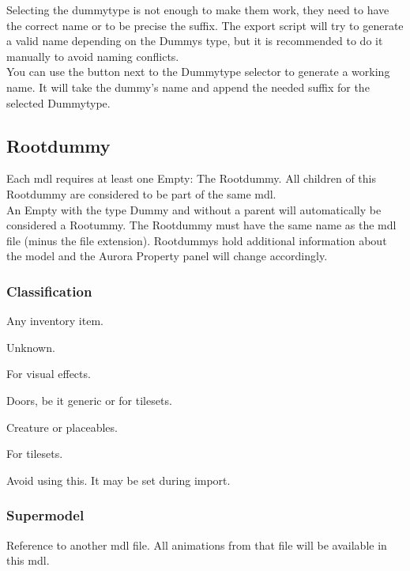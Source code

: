 Selecting the dummytype is not enough to make them work, they need to have
the correct name or to be precise the suffix.
The export script will try to generate a valid name depending on
the Dummys type, but it is recommended to do it manually to avoid naming
conflicts. \\

You can use the button next to the Dummytype selector to generate a
working name. It will take the dummy's name and append the needed suffix for
the selected Dummytype. \\

\subsection{Rootdummy}
Each mdl requires at least one Empty: The Rootdummy. All children
of this Rootdummy are considered to be part of the same mdl. \\

An Empty with the type Dummy and without a parent will automatically be
considered a Rootummy. The Rootdummy must have the same name as the
mdl file (minus the file extension). Rootdummys hold additional
information about the model and the Aurora Property panel will
change accordingly.

\subsubsection*{Classification}
\begin{description}[leftmargin=6em,style=nextline]
    \item[Item] Any inventory item.
    \item[GUI] Unknown.
    \item[Effect] For visual effects.
    \item[Door] Doors, be it generic or for tilesets.
    \item[Character] Creature or placeables. 
    \item[Tile] For tilesets.
    \item[Unknown] Avoid using this. It may be set during import.
\end{description}

\subsubsection*{Supermodel}
Reference to another mdl file. All animations from that file 
will be available in this mdl.

